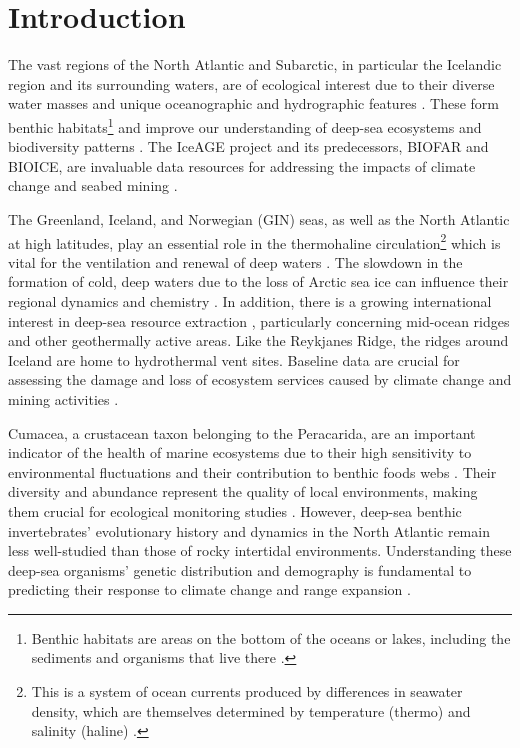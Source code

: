 \section{Introduction}\label{introduction}
The vast regions of the North Atlantic and Subarctic, in particular the Icelandic region and its surrounding waters, are of ecological interest due to their diverse water masses and unique oceanographic and hydrographic features \citep{schnurr_composition_2014, meisner_benthic_2014, uhlir_adding_2021}. These form {benthic habitats}\footnote{Benthic habitats are areas on the bottom of the oceans or lakes, including the sediments and organisms that live there \citep{levin2009ecological}.} and improve our understanding of deep-sea ecosystems and biodiversity patterns \citep{rogers2007corals, danovaro2008exponential, uhlir_adding_2021}. The IceAGE project and its predecessors, BIOFAR and BIOICE, are invaluable data resources for addressing the impacts of climate change and seabed mining \citep{meisner_prefacebiodiversity_2018}.  

The Greenland, Iceland, and Norwegian (GIN) seas, as well as the North Atlantic at high latitudes, play an essential role in the {thermohaline circulation}\footnote{This is a system of ocean currents produced by differences in seawater density, which are themselves determined by temperature (thermo) and salinity (haline) \citep{talley2013closure}.} which is vital for the ventilation and renewal of deep waters \citep{johannessen_relationship_1994}. The slowdown in the formation of cold, deep waters due to the loss of Arctic sea ice can influence their regional dynamics and chemistry \citep{meisner_prefacebiodiversity_2018}. In addition, there is a growing international interest in deep-sea resource extraction \citep{mengerink_call_2014}, particularly concerning mid-ocean ridges and other geothermally active areas. Like the Reykjanes Ridge, the ridges around Iceland are home to hydrothermal vent sites. Baseline data are crucial for assessing the damage and loss of ecosystem services caused by climate change and mining activities \citep{meisner_prefacebiodiversity_2018}. 

Cumacea, a crustacean taxon belonging to the Peracarida, are an important indicator of the health of marine ecosystems due to their high sensitivity to environmental fluctuations \citep{stransky_diversity_2010} and their contribution to benthic foods webs \citep{rehm2009cumacea}. Their diversity and abundance represent the quality of local environments, making them crucial for ecological monitoring studies \citep{hessler1967faunal}. However, deep-sea benthic invertebrates' evolutionary history and dynamics in the North Atlantic remain less well-studied than those of rocky intertidal environments. Understanding these deep-sea organisms' genetic distribution and demography is fundamental to predicting their response to climate change and range expansion \citep{jennings_phylogeographic_2014}. 


